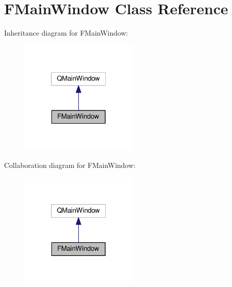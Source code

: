 \hypertarget{classFMainWindow}{}\section{F\+Main\+Window Class Reference}
\label{classFMainWindow}


Inheritance diagram for F\+Main\+Window\+:
\nopagebreak
\begin{figure}[H]
\begin{center}
\leavevmode
\includegraphics[width=160pt]{classFMainWindow__inherit__graph}
\end{center}
\end{figure}


Collaboration diagram for F\+Main\+Window\+:
\nopagebreak
\begin{figure}[H]
\begin{center}
\leavevmode
\includegraphics[width=160pt]{classFMainWindow__coll__graph}
\end{center}
\end{figure}
